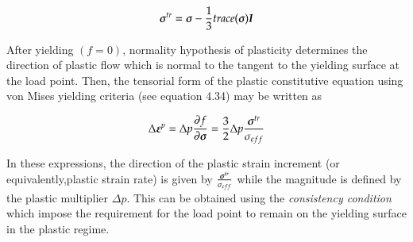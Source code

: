 \begin{equation} \label{deviatoric stress}
	{\ensuremath{\boldsymbol{\sigma}}}^{tr}=\boldsymbol{\sigma} - \frac{1}{3} trace(\boldsymbol{\sigma}) \boldsymbol{I}
\end{equation} 

After yielding $(f = 0)$, normality hypothesis of plasticity determines the direction of plastic flow which is normal to the tangent to the yielding surface at the load point. Then, the tensorial form of the plastic constitutive equation using von Mises yielding criteria (see equation 4.34) may be written as

\begin{equation} \label{plastic contitutive equation}
	\Delta {\ensuremath{\boldsymbol{\varepsilon}}}^p = \Delta p \frac {\partial{f}}{\partial{\ensuremath{\boldsymbol{\sigma}}}}=\frac{3}{2} \Delta p \frac{{\boldsymbol{\sigma}}^{tr}}{\sigma_{eff}}
\end{equation}

In these expressions, the direction of the plastic strain increment (or equivalently,plastic strain rate) is given by $\frac{{\boldsymbol{\sigma}}^{tr}}{\sigma_{eff}}$ while the magnitude is defined by the plastic multiplier $\Delta p$. This can be obtained using the \textit{consistency condition} which impose the requirement for the load point to remain on the yielding surface in the plastic regime.

